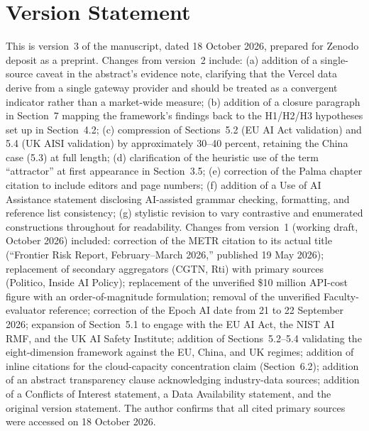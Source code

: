 \section*{Version Statement}

This is version~3 of the manuscript, dated 18 October 2026, prepared for Zenodo deposit as a preprint. Changes from version~2 include: (a) addition of a single-source caveat in the abstract's evidence note, clarifying that the Vercel data derive from a single gateway provider and should be treated as a convergent indicator rather than a market-wide measure; (b) addition of a closure paragraph in Section~7 mapping the framework's findings back to the H1/H2/H3 hypotheses set up in Section~4.2; (c) compression of Sections~5.2 (EU AI Act validation) and 5.4 (UK AISI validation) by approximately 30--40 percent, retaining the China case (5.3) at full length; (d) clarification of the heuristic use of the term ``attractor'' at first appearance in Section~3.5; (e) correction of the Palma chapter citation to include editors and page numbers; (f) addition of a Use of AI Assistance statement disclosing AI-assisted grammar checking, formatting, and reference list consistency; (g) stylistic revision to vary contrastive and enumerated constructions throughout for readability. Changes from version~1 (working draft, October 2026) included: correction of the METR citation to its actual title (``Frontier Risk Report, February--March 2026,'' published 19 May 2026); replacement of secondary aggregators (CGTN, Rti) with primary sources (Politico, Inside AI Policy); replacement of the unverified \$10 million API-cost figure with an order-of-magnitude formulation; removal of the unverified Faculty-evaluator reference; correction of the Epoch AI date from 21 to 22 September 2026; expansion of Section~5.1 to engage with the EU AI Act, the NIST AI RMF, and the UK AI Safety Institute; addition of Sections~5.2--5.4 validating the eight-dimension framework against the EU, China, and UK regimes; addition of inline citations for the cloud-capacity concentration claim (Section~6.2); addition of an abstract transparency clause acknowledging industry-data sources; addition of a Conflicts of Interest statement, a Data Availability statement, and the original version statement. The author confirms that all cited primary sources were accessed on 18 October 2026.

